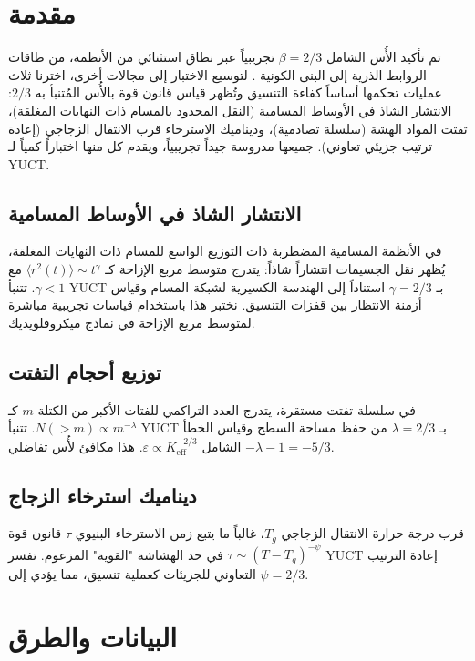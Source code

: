 \documentclass[11pt,a4paper]{article}
\newcommand{\eps}{\varepsilon}
\newcommand{\Keff}{K_{\mathrm{eff}}}
\newcommand{\betaf}{\beta}
\begin{document}
	\section{مقدمة}
	
	تم تأكيد الأُس الشامل \(\betaf = 2/3\) تجريبياً عبر نطاق استثنائي من الأنظمة، من طاقات الروابط الذرية إلى البنى الكونية \cite{AppendixY, AppendixL, AppendixC, AppendixG}. لتوسيع الاختبار إلى مجالات أخرى، اخترنا ثلاث عمليات تحكمها أساساً كفاءة التنسيق وتُظهر قياس قانون قوة بالأُس المُتنبأ به \(2/3\): الانتشار الشاذ في الأوساط المسامية (النقل المحدود بالمسام ذات النهايات المغلقة)، تفتت المواد الهشة (سلسلة تصادمية)، وديناميك الاسترخاء قرب الانتقال الزجاجي (إعادة ترتيب جزيئي تعاوني). جميعها مدروسة جيداً تجريبياً، ويقدم كل منها اختباراً كمياً لـ YUCT.
	
	\subsection{الانتشار الشاذ في الأوساط المسامية}
	في الأنظمة المسامية المضطربة ذات التوزيع الواسع للمسام ذات النهايات المغلقة، يُظهر نقل الجسيمات انتشاراً شاذاً: يتدرج متوسط مربع الإزاحة كـ \(\langle r^2(t) \rangle \sim t^{\gamma}\) مع \(\gamma < 1\). تتنبأ YUCT بـ \(\gamma = 2/3\) استناداً إلى الهندسة الكسيرية لشبكة المسام وقياس أزمنة الانتظار بين قفزات التنسيق. نختبر هذا باستخدام قياسات تجريبية مباشرة لمتوسط مربع الإزاحة في نماذج ميكروفلويديك.
	
	\subsection{توزيع أحجام التفتت}
	في سلسلة تفتت مستقرة، يتدرج العدد التراكمي للفتات الأكبر من الكتلة \(m\) كـ \(N(>m) \propto m^{-\lambda}\). تتنبأ YUCT بـ \(\lambda = 2/3\) من حفظ مساحة السطح وقياس الخطأ الشامل \(\eps \propto \Keff^{-2/3}\). هذا مكافئ لأُس تفاضلي \(-\lambda - 1 = -5/3\).
	
	\subsection{ديناميك استرخاء الزجاج}
	قرب درجة حرارة الانتقال الزجاجي \(T_g\)، غالباً ما يتبع زمن الاسترخاء البنيوي \(\tau\) قانون قوة \(\tau \sim (T - T_g)^{-\psi}\) في حد الهشاشة "القوية" المزعوم. تفسر YUCT إعادة الترتيب التعاوني للجزيئات كعملية تنسيق، مما يؤدي إلى \(\psi = 2/3\).
	
	\section{البيانات والطرق}
	
\end{document}

